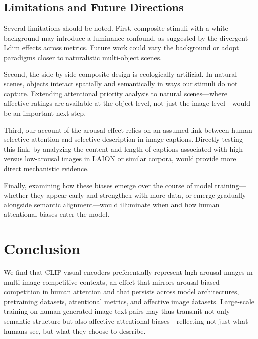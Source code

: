 \documentclass[12pt]{article}
\begin{document}
\subsection{Limitations and Future Directions}

Several limitations should be noted. First, composite stimuli with a white background may introduce a luminance confound, as suggested by the divergent Ldim effects across metrics. Future work could vary the background or adopt paradigms closer to naturalistic multi-object scenes.

Second, the side-by-side composite design is ecologically artificial. In natural scenes, objects interact spatially and semantically in ways our stimuli do not capture. Extending attentional priority analysis to natural scenes---where affective ratings are available at the object level, not just the image level---would be an important next step.

Third, our account of the arousal effect relies on an assumed link between human selective attention and selective description in image captions. Directly testing this link, by analyzing the content and length of captions associated with high- versus low-arousal images in LAION or similar corpora, would provide more direct mechanistic evidence.

Finally, examining how these biases emerge over the course of model training---whether they appear early and strengthen with more data, or emerge gradually alongside semantic alignment---would illuminate when and how human attentional biases enter the model.

\section{Conclusion}

We find that CLIP visual encoders preferentially represent high-arousal images in multi-image competitive contexts, an effect that mirrors arousal-biased competition in human attention and that persists across model architectures, pretraining datasets, attentional metrics, and affective image datasets. Large-scale training on human-generated image-text pairs may thus transmit not only semantic structure but also affective attentional biases---reflecting not just what humans see, but what they choose to describe.



\end{document}
